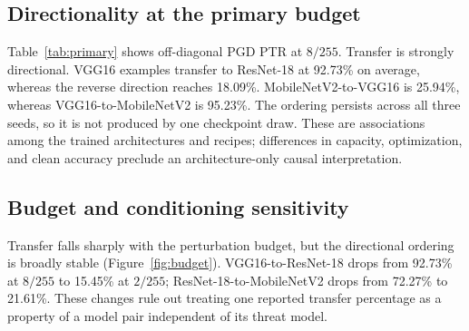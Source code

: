 \documentclass[10pt]{article}
\begin{document}
\begin{table}[t]
\centering
\caption{Mean source ASR (\%) over three seeds.}
\label{tab:asr}
\end{table}

\subsection{Directionality at the primary budget}
Table~\ref{tab:primary} shows off-diagonal PGD PTR at $8/255$. Transfer is strongly directional. VGG16 examples transfer to ResNet-18 at 92.73\% on average, whereas the reverse direction reaches 18.09\%. MobileNetV2-to-VGG16 is 25.94\%, whereas VGG16-to-MobileNetV2 is 95.23\%. The ordering persists across all three seeds, so it is not produced by one checkpoint draw. These are associations among the trained architectures and recipes; differences in capacity, optimization, and clean accuracy preclude an architecture-only causal interpretation.

\begin{table}[t]
\centering
\caption{PGD PTR (\%) at $8/255$, reported as mean [minimum, maximum] over three training seeds.}
\label{tab:primary}
\end{table}

\subsection{Budget and conditioning sensitivity}
Transfer falls sharply with the perturbation budget, but the directional ordering is broadly stable (Figure~\ref{fig:budget}). VGG16-to-ResNet-18 drops from 92.73\% at $8/255$ to 15.45\% at $2/255$; ResNet-18-to-MobileNetV2 drops from 72.27\% to 21.61\%. These changes rule out treating one reported transfer percentage as a property of a model pair independent of its threat model.
\end{document}
